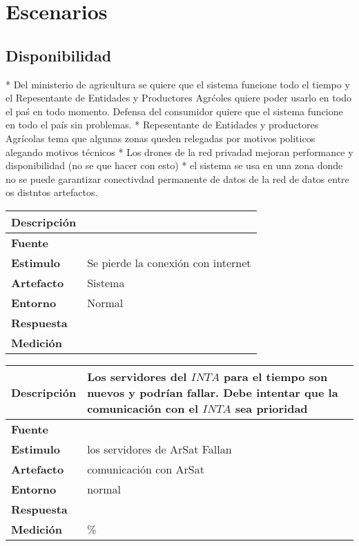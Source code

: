 \section{Escenarios}
\subsection{Disponibilidad}
* Del ministerio de agricultura se quiere que el sistema funcione todo el tiempo y el Repesentante de Entidades y Productores Agr\'coles quiere poder usarlo en todo el pa\'s en todo momento. Defensa del consumidor quiere que el sistema funcione en todo el pa\'is sin problemas.
* Repesentante de Entidades y productores Agr\'icolas tema que algunas zonas queden relegadas por motivos politicos alegando motivos t\'ecnicos
* Los drones de la red privadad mejoran performance y disponibilidad (no se que hacer con esto)
* el sistema se usa en una zona donde no se puede garantizar conectivdad permanente de datos de la red de datos entre os distntos artefactos.

\begin{tabular}{| l || p{12cm} |}
\hline 
\textbf{Descripci\'on} & \\
\hline 
\textbf{Fuente} & \\
\hline 
\textbf{Estimulo} & Se pierde la conexi\'on con internet \\
\hline 
\textbf{Artefacto} & Sistema\\
\hline 
\textbf{Entorno} & Normal \\
\hline 
\textbf{Respuesta} & \\
\hline 
\textbf{Medici\'on} & \\
\hline 
\end{tabular}

\begin{tabular}{| l || p{12cm} |}
\hline 
\textbf{Descripci\'on} & Los servidores del $INTA$ para el tiempo son nuevos y podr\'ian fallar. Debe intentar que la comunicaci\'on con el $INTA$ sea prioridad\\
\hline 
\textbf{Fuente} & \\
\hline 
\textbf{Estimulo} & los servidores de ArSat Fallan\\
\hline 
\textbf{Artefacto} & comunicaci\'on con ArSat\\
\hline 
\textbf{Entorno} & normal \\
\hline 
\textbf{Respuesta} & \\
\hline 
\textbf{Medici\'on} & \% \\
\hline 
\end{tabular}


